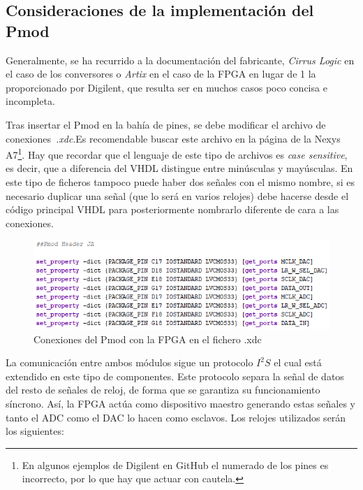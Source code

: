 \subsection{Consideraciones de la implementación del Pmod}
Generalmente, se ha recurrido a la documentación del fabricante, \emph{Cirrus Logic} en el caso de los conversores o \emph{Artix} en el caso de la FPGA en lugar de 1 la proporcionado por Digilent, que resulta ser en muchos casos poco concisa e incompleta.

Tras insertar el Pmod en la bahía de pines, se debe modificar el archivo de conexiones~\emph{.xdc}.Es recomendable buscar este archivo en la página de la Nexys A7\footnote{En algunos ejemplos de Digilent en GitHub el numerado de los pines es incorrecto, por lo que hay que actuar con cautela.}. Hay que recordar que el lenguaje de este tipo de archivos es \emph{case sensitive}, es decir, que a diferencia del VHDL distingue entre minúsculas y mayúsculas. En este tipo de ficheros tampoco puede haber dos señales con el mismo nombre, si es necesario duplicar una señal (que lo será en varios relojes) debe hacerse desde el código principal VHDL para posteriormente nombrarlo diferente de cara a las conexiones. 

\begin{figure}[!ht]
\begin{center}
\includegraphics[width=12cm]{img/xdc.png}
\caption{\label{fig:xdc}Conexiones del Pmod con la FPGA en el fichero .xdc}
\end{center}
\end{figure}

La comunicación entre ambos módulos sigue un protocolo $I^{2}S$ \cite{i2s} el cual está extendido en este tipo de componentes. Este protocolo separa la señal de datos del resto de señales de reloj, de forma que se garantiza su funcionamiento síncrono. Así, la FPGA actúa como dispositivo maestro generando estas señales y tanto el ADC como el DAC lo hacen como esclavos. Los relojes utilizados serán los siguientes:


